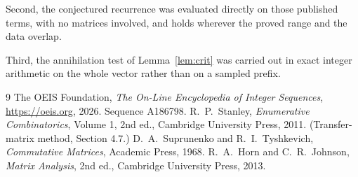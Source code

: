 \documentclass[11pt,a4paper]{article}
\theoremstyle{plain}
\theoremstyle{definition}
\begin{document}
Second, the conjectured recurrence was evaluated directly on those published terms, with no
matrices involved, and holds wherever the proved range and the data overlap.

Third, the annihilation test of Lemma~\ref{lem:crit} was carried out in exact integer
arithmetic on the whole vector rather than on a sampled prefix.

\begin{thebibliography}{9}
 The OEIS Foundation, \emph{The On-Line Encyclopedia of Integer
Sequences}, \url{https://oeis.org}, 2026. Sequence A186798.
 R.~P.~Stanley, \emph{Enumerative Combinatorics}, Volume 1, 2nd ed.,
Cambridge University Press, 2011. (Transfer-matrix method, Section 4.7.)
 D.~A.~Suprunenko and R.~I.~Tyshkevich, \emph{Commutative Matrices},
Academic Press, 1968.
 R.~A.~Horn and C.~R.~Johnson, \emph{Matrix Analysis}, 2nd ed., Cambridge
University Press, 2013.
\end{thebibliography}
\end{document}
